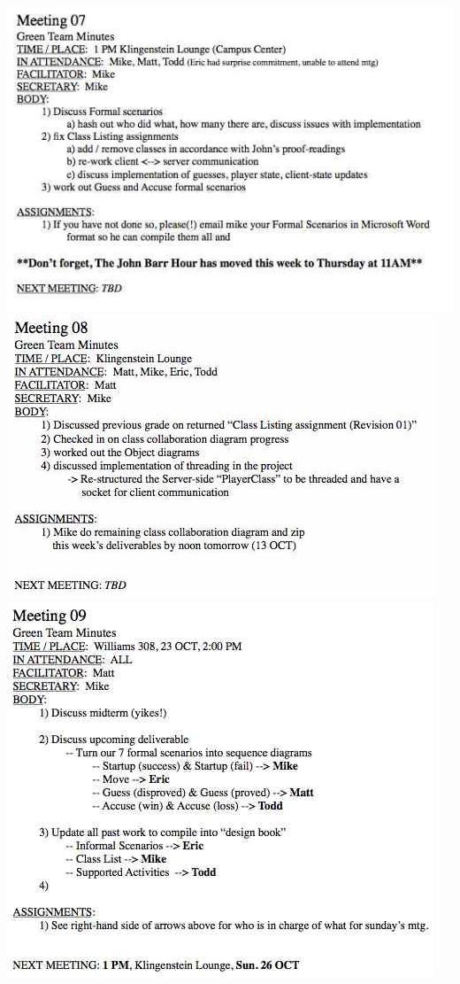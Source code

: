 \begin{flushleft}
	\newpage
	\includegraphics[scale=0.75]{../DesignDocumentation/Minutes/Minutes_07.jpg}
	\newpage
	\includegraphics{../DesignDocumentation/Minutes/Minutes_08.jpg}
	\newpage
	\includegraphics[scale=0.75]{../DesignDocumentation/Minutes/Minutes_09.jpg}

\end{flushleft}
